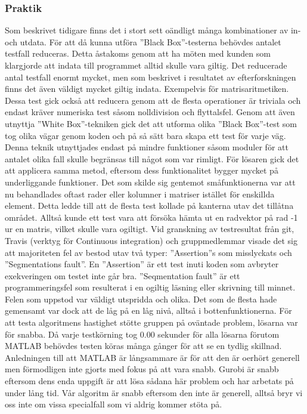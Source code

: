 	\subsubsection{Praktik}
	Som beskrivet tidigare finns det i stort sett oändligt många kombinationer av in- och utdata.	För att då kunna utföra ''Black Box''-testerna behövdes antalet testfall reduceras. Detta åstakoms genom att ha möten med kunden som klargjorde att indata till programmet alltid skulle vara giltig. Det reducerade antal testfall enormt mycket, men som beskrivet i resultatet av efterforskningen finns det även väldigt mycket giltig indata. Exempelvis för matrisaritmetiken. Dessa test gick också att reducera genom att de flesta operationer är triviala och endast kräver numeriska test såsom nolldivision och flyttalsfel. Genom att även utnyttja ''White Box''-tekniken gick det att utforma olika ''Black Box''-test som tog olika vägar genom koden och på så sätt bara skapa ett test för varje väg. Denna teknik utnyttjades endast på mindre funktioner såsom moduler för att antalet olika fall skulle begränsas till något som var rimligt. \newline
	För lösaren gick det att applicera samma metod, eftersom dess funktionalitet bygger mycket på underliggande funktioner. Det som skilde sig gentemot småfunktionerna var att nu behandlades oftast rader eller kolumner i matriser istället för enskillda element. Detta ledde till att de flesta test kollade på kanterna utav det tillåtna området. Alltså kunde ett test vara att försöka hämta ut en radvektor på rad -1 ur en matris, vilket skulle vara ogiltigt.\newline
Vid granskning av testresultat från git, Travis (verktyg för Continuous integration) och gruppmedlemmar visade det sig att majoriteten fel av bestod utav två typer: ''Assertion''s som misslyckats och ''Segmentations fault''. En ''Assertion'' är ett test inuti koden som avbryter exekveringen om testet inte går bra. ''Seqmentation fault'' är ett programmeringsfel som resulterat i en ogiltig läsning eller skrivning till minnet. Felen som uppstod var väldigt utspridda och olika. Det som de flesta hade gemensamt var dock att de låg på en låg nivå, alltså i bottenfunktionerna. \newline	
	För att testa algoritmens hastighet stötte gruppen på oväntade problem, lösarna var för snabba.	Då varje testkörning tog 0.00 sekunder för alla lösarna förutom MATLAB behövdes testen köras många gånger för att se en tydlig skillnad. Anledningen till att MATLAB är långsammare är för att den är oerhört generell men förmodligen inte gjorts med fokus på att vara snabb. Gurobi är snabb eftersom dens enda uppgift är att lösa sådana här problem och har arbetats på under lång tid. Vår algoritm är snabb eftersom den inte är generell, alltså bryr vi oss inte om vissa specialfall som vi aldrig kommer stöta på. \newline
